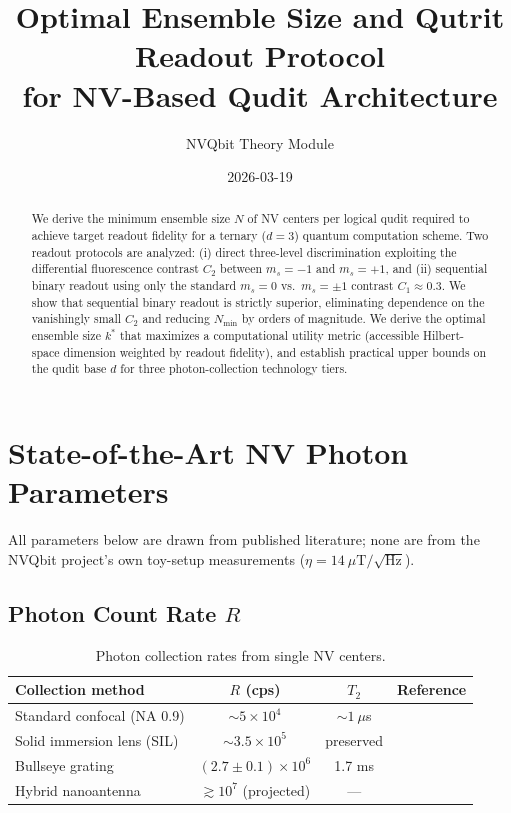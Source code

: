 \documentclass[11pt,letterpaper]{article}
\title{Optimal Ensemble Size and Qutrit Readout Protocol \\
for NV-Based Qudit Architecture}
\author{NVQbit Theory Module}
\date{2026-03-19}
\begin{document}
\maketitle

\begin{abstract}
We derive the minimum ensemble size $N$ of NV centers per logical qudit
required to achieve target readout fidelity for a ternary ($d=3$) quantum
computation scheme.  Two readout protocols are analyzed: (i) direct
three-level discrimination exploiting the differential fluorescence contrast
$C_2$ between $m_s = -1$ and $m_s = +1$, and (ii) sequential binary readout
using only the standard $m_s = 0$ vs.\ $m_s = \pm 1$ contrast $C_1 \approx 0.3$.
We show that sequential binary readout is strictly superior, eliminating
dependence on the vanishingly small $C_2$ and reducing $N_{\min}$ by orders of
magnitude.  We derive the optimal ensemble size $k^*$ that maximizes a
computational utility metric (accessible Hilbert-space dimension weighted by
readout fidelity), and establish practical upper bounds on the qudit base $d$
for three photon-collection technology tiers.
\end{abstract}

\tableofcontents

\section{State-of-the-Art NV Photon Parameters}
\label{sec:params}

All parameters below are drawn from published literature; none are from the
NVQbit project's own toy-setup measurements ($\eta = 14~\mu\text{T}/\!\sqrt{\text{Hz}}$).

\subsection{Photon Count Rate $R$}

\begin{table}[h]
\centering
\caption{Photon collection rates from single NV centers.}
\label{tab:rates}
\begin{tabular}{lccl}
\toprule
\textbf{Collection method} & \textbf{$R$ (cps)} & \textbf{$T_2$} & \textbf{Reference} \\
\midrule
Standard confocal (NA 0.9) & $\sim 5 \times 10^4$ & $\sim 1~\mu$s & \cite{Barry2020} \\  %
Solid immersion lens (SIL) & $\sim 3.5 \times 10^5$ & preserved & \cite{Hadden2010} \\  %
Bullseye grating & $(2.7 \pm 0.1) \times 10^6$ & 1.7 ms & \cite{Li2015} \\  %
Hybrid nanoantenna & $\gtrsim 10^7$ (projected) & --- & \cite{Barbiero2025} \\  %
\bottomrule
\end{tabular}
\end{table}
\end{document}
